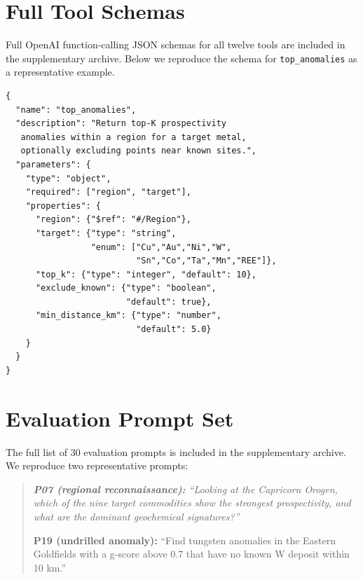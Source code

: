 \documentclass[11pt]{article}
\begin{document}


\appendix

\section{Full Tool Schemas}
\label{sec:appendix-tools}


Full OpenAI function-calling JSON schemas for all twelve tools are
included in the supplementary archive. Below we reproduce the schema
for \texttt{top\_anomalies} as a representative example.

\begin{lstlisting}[style=jsonstyle]
{
  "name": "top_anomalies",
  "description": "Return top-K prospectivity
   anomalies within a region for a target metal,
   optionally excluding points near known sites.",
  "parameters": {
    "type": "object",
    "required": ["region", "target"],
    "properties": {
      "region": {"$ref": "#/Region"},
      "target": {"type": "string",
                 "enum": ["Cu","Au","Ni","W",
                          "Sn","Co","Ta","Mn","REE"]},
      "top_k": {"type": "integer", "default": 10},
      "exclude_known": {"type": "boolean",
                        "default": true},
      "min_distance_km": {"type": "number",
                          "default": 5.0}
    }
  }
}
\end{lstlisting}

\section{Evaluation Prompt Set}
\label{sec:appendix-prompts}

The full list of 30 evaluation prompts is included in the
supplementary archive. We reproduce two representative prompts:

\begin{quote}\itshape
\textbf{P07 (regional reconnaissance):} ``Looking at the Capricorn
Orogen, which of the nine target commodities show the strongest
prospectivity, and what are the dominant geochemical signatures?''

\textbf{P19 (undrilled anomaly):} ``Find tungsten anomalies in the
Eastern Goldfields with a g-score above 0.7 that have no known
W deposit within 10 km.''
\end{quote}
\end{document}
